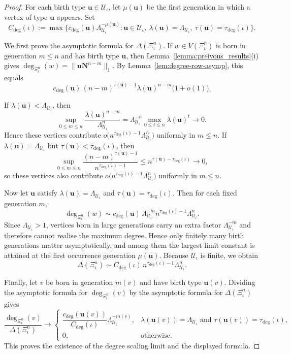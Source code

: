 \documentclass[12pt]{iopart}
\begin{document}
\begin{proof}
For each birth type $\mathbf u\in\mathcal U_\iota$, let $\mu(\mathbf u)$ be the first generation in which a vertex of type $\mathbf u$ appears.
Set
\[
C_{\deg}(\iota)
:=
\max\big\{
c_{\deg}(\mathbf u)\Lambda_{\mathcal U_\iota}^{-\mu(\mathbf u)}:
\mathbf u\in\mathcal U_\iota,\
\lambda(\mathbf u)=\Lambda_{\mathcal U_\iota},\
\tau(\mathbf u)=\tau_{\deg}(\iota)
\big\}.
\]

We first prove the asymptotic formula for $\Delta(\Xi_\iota^n)$.
If $w\in V(\Xi_\iota^n)$ is born in generation $m\le n$ and has birth type $\mathbf u$, then Lemma~\ref{lemma:preivous_results}(i) gives
$\deg_{\Xi_\iota^n}(w)=\|\mathbf u\mathbf N^{n-m}\|_1$.
By Lemma~\ref{lem:degree-row-asymp}, this equals
\[
c_{\deg}(\mathbf u)\,(n-m)^{\tau(\mathbf u)-1}\lambda(\mathbf u)^{n-m}
\big(1+o(1)\big).
\]

If $\lambda(\mathbf u)<\Lambda_{\mathcal U_\iota}$, then
\[
\sup_{0\le m\le n}
\frac{\lambda(\mathbf u)^{n-m}}{\Lambda_{\mathcal U_\iota}^n}
=
\Lambda_{\mathcal U_\iota}^{-n}
\max_{0\le t\le n}\lambda(\mathbf u)^t
\to 0.
\]
Hence these vertices contribute
$o\big(n^{\tau_{\deg}(\iota)-1}\Lambda_{\mathcal U_\iota}^n\big)$ uniformly in $m\le n$.
If $\lambda(\mathbf u)=\Lambda_{\mathcal U_\iota}$ but $\tau(\mathbf u)<\tau_{\deg}(\iota)$, then
\[
\sup_{0\le m\le n}
\frac{(n-m)^{\tau(\mathbf u)-1}}{n^{\tau_{\deg}(\iota)-1}}
\le
n^{\tau(\mathbf u)-\tau_{\deg}(\iota)}
\to 0,
\]
so these vertices also contribute
$o\big(n^{\tau_{\deg}(\iota)-1}\Lambda_{\mathcal U_\iota}^n\big)$ uniformly in $m\le n$.

Now let $\mathbf u$ satisfy
$\lambda(\mathbf u)=\Lambda_{\mathcal U_\iota}$ and $\tau(\mathbf u)=\tau_{\deg}(\iota)$.
Then for each fixed generation $m$,
\[
\deg_{\Xi_\iota^n}(w)
\sim
c_{\deg}(\mathbf u)\,\Lambda_{\mathcal U_\iota}^{-m}
n^{\tau_{\deg}(\iota)-1}\Lambda_{\mathcal U_\iota}^n.
\]
Since $\Lambda_{\mathcal U_\iota}>1$, vertices born in large generations carry an extra factor
$\Lambda_{\mathcal U_\iota}^{-m}$ and therefore cannot realise the maximum degree.
Hence only finitely many birth generations matter asymptotically, and among them the largest limit constant is attained at the first occurrence generation $\mu(\mathbf u)$.
Because $\mathcal U_\iota$ is finite, we obtain
\[
\Delta(\Xi_\iota^n)
\sim
C_{\deg}(\iota)\,
n^{\tau_{\deg}(\iota)-1}\Lambda_{\mathcal U_\iota}^n.
\]

Finally, let $v$ be born in generation $m(v)$ and have birth type $\mathbf u(v)$.
Dividing the asymptotic formula for $\deg_{\Xi_\iota^n}(v)$ by the asymptotic formula for
$\Delta(\Xi_\iota^n)$ gives
\[
\frac{\deg_{\Xi_\iota^n}(v)}{\Delta(\Xi_\iota^n)}
\to
\begin{cases}
\dfrac{c_{\deg}(\mathbf u(v))}{C_{\deg}(\iota)}
\Lambda_{\mathcal U_\iota}^{-m(v)},
&
\lambda(\mathbf u(v))=\Lambda_{\mathcal U_\iota}
\text{ and }
\tau(\mathbf u(v))=\tau_{\deg}(\iota),
\\[2ex]
0,
&
\text{otherwise}.
\end{cases}
\]
This proves the existence of the degree scaling limit and the displayed formula.
\end{proof}
\end{document}
